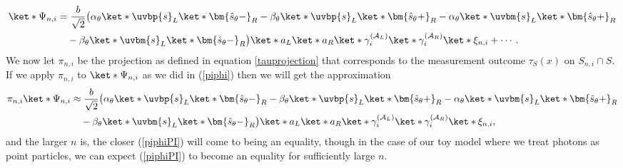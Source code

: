 \documentclass[12pt]{report}
\begin{document}
\begin{equation}\label{bellstatePI3}
	\begin{split}
	\ket*{\Psi_{n,i}}&=\frac{b}{\sqrt{2}}\big(\alpha_\theta\ket*{\uvbp{s}}_L\ket*{\bm{\hat{s}_\theta-}}_R
	-\beta_\theta\ket*{\uvbp{s}}_L\ket*{\bm{\hat{s}_\theta+}}_R-\alpha_\theta\ket*{\uvbm{s}}_L\ket*{\bm{\hat{s}_\theta+}}_R\\
	&\quad
	-\beta_\theta\ket*{\uvbm{s}}_L\ket*{\bm{\hat{s}_\theta-}}_R\big)\ket*{a}_L\ket*{a}_R\ket*{\gamma_i^{(\mathcal{A}_L)}}\ket*{\gamma_i^{(\mathcal{A}_R)}}\ket*{\xi_{n,i}}+\cdots.
	\end{split}
\end{equation}
We now let $\pi_{n,i}$ be the projection as defined in equation \ref{tauprojection} that corresponds to the measurement outcome $\tau_S(x)$ on $S_{n,i}\cap S$. If we apply $\pi_{n,i}$ to $\ket*{\Psi_{n,i}}$ as we did in (\ref{piphi}) then we will get the approximation
\begin{equation}\label{piphiPI}
	\begin{split}
		\pi_{n,i}\ket*{\Psi_{n,i}}&\approx\frac{b}{\sqrt{2}}\big(\alpha_\theta\ket*{\uvbp{s}}_L\ket*{\bm{\hat{s}_\theta-}}_R
		-\beta_\theta\ket*{\uvbp{s}}_L\ket*{\bm{\hat{s}_\theta+}}_R-\alpha_\theta\ket*{\uvbm{s}}_L\ket*{\bm{\hat{s}_\theta+}}_R\\
		&\quad
		-\beta_\theta\ket*{\uvbm{s}}_L\ket*{\bm{\hat{s}_\theta-}}_R\big)\ket*{a}_L\ket*{a}_R\ket*{\gamma_i^{(\mathcal{A}_L)}}\ket*{\gamma_i^{(\mathcal{A}_R)}}\ket*{\xi_{n,i}},
		\end{split}
\end{equation}
and the larger $n$ is, the closer (\ref{piphiPI}) will come to being an equality, though in the case of our toy model where we treat photons as point particles, we can expect (\ref{piphiPI}) to become an equality for sufficiently large $n$.
\end{document}
